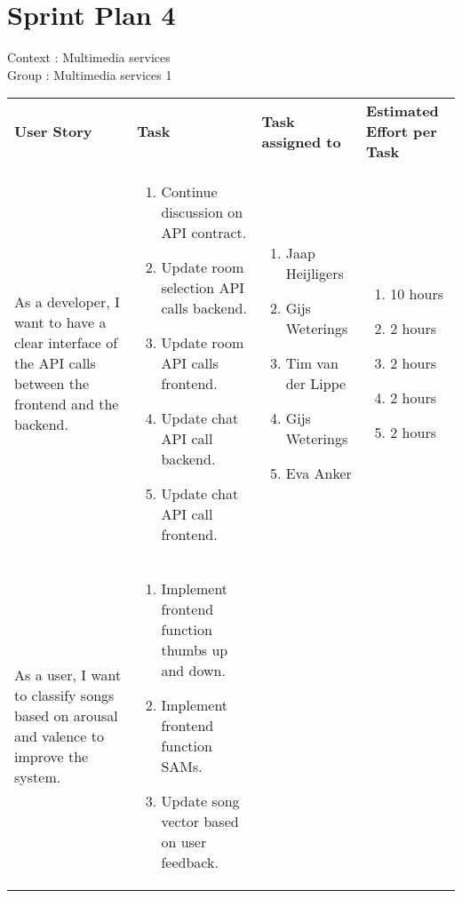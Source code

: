 \documentclass[11pt,a4paper]{article}
\begin{document}
\section*{Sprint Plan 4}
Context : Multimedia services\\
Group : Multimedia services 1\\



\begin{table}[h]
\begin{tabular}{|p{4.5cm}|p{7cm}|p{4cm}|p{2.6cm}|}
\textbf{User Story} & \textbf{Task} & \textbf{Task assigned to} & \textbf{Estimated Effort per Task} \\


As a developer, I want to have a clear interface of the API calls between the frontend and the backend.

&
\begin{enumerate}
\item Continue discussion on API contract.
\item Update room selection API calls backend.
\item Update room API calls frontend.
\item Update chat API call backend.
\item Update chat API call frontend.
\end{enumerate}

& 
\begin{enumerate}
\item Jaap Heijligers
\item Gijs Weterings
\item Tim van der Lippe
\item Gijs Weterings
\item Eva Anker
\end{enumerate}

& 
\begin{enumerate}
\item 10 hours
\item 2 hours
\item 2 hours
\item 2 hours
\item 2 hours
\end{enumerate}
\\

As a user, I want to classify songs based on arousal and valence to improve the system.

&
\begin{enumerate}
\item Implement frontend function thumbs up and down.
\item Implement frontend function SAMs.
\item Update song vector based on user feedback.
\end{enumerate}


\end{tabular}
\end{table}
\end{document}
